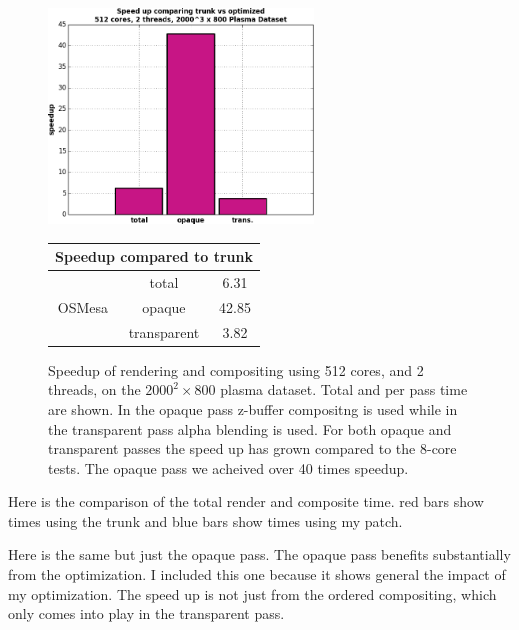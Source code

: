 \documentclass[a4paper,10pt]{report}
\begin{document}
 \begin{figure}
 \centering
 \begin{minipage}[c]{0.5\textwidth}
 \begin{center}
 \includegraphics[height=2.25in]{./speed_up_vpic.png} 
 \end{center}
 \end{minipage}
 \begin{minipage}{0.3\textwidth}
  \begin{center}
  \def\arraystretch{1.5}
{\footnotesize
\begin{tabular}{|c|c|c|}
 \hline
 \multicolumn{3}{|c|}{\bf{Speedup compared to trunk}} \\ \hline
\multirow{3}{*}{OSMesa} & total & 6.31 \\ \cline{2-3}
 & opaque & 42.85 \\ \cline{2-3}
 & transparent & 3.82 \\ \hline
\end{tabular}}
\end{center}
\end{minipage}
\caption{Speedup of rendering and compositing using 512 cores, and 2 threads, on the $2000^2 \times 800$ plasma dataset. Total and per pass time are shown. In the opaque pass z-buffer compositng is used while in the transparent pass alpha blending is used. For both opaque and transparent passes the speed up has grown compared to the 8-core tests. The opaque pass we acheived over 40 times speedup.}
\label{fig:speedup_vpic}
\end{figure}








Here is the comparison of the total render and composite time. red bars show times using the trunk and blue bars show times using my patch.

Here is the same but just the opaque pass. The opaque pass benefits substantially from the optimization. I included this one because it shows general the impact of my optimization. The speed up is not just from the ordered compositing, which only comes into play in the transparent pass.
\end{document}
